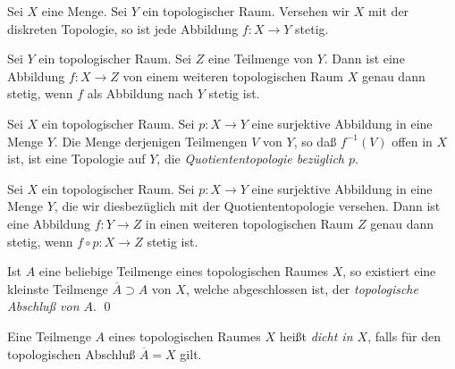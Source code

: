 \begin{example}
	Sei \(X\) eine Menge. Sei \(Y\) ein topologischer Raum. Versehen wir \(X\) mit der
	diskreten Topologie, so ist jede Abbildung \(f\colon X \to Y\) stetig.
\end{example}

\begin{example}
	Sei \(Y\) ein topologischer Raum. Sei \(Z\) eine Teilmenge von \(Y\). Dann ist eine Abbildung \(f\colon X \to Z\)
	von einem weiteren topologischen Raum \(X\) genau dann stetig, wenn \(f\) als Abbildung nach \(Y\) stetig ist.
\end{example}

\begin{definition}
	Sei \(X\) ein topologischer Raum. Sei \(p\colon X \to Y\) eine surjektive Abbildung in eine Menge \(Y\). Die Menge
	derjenigen Teilmengen \(V\) von \(Y\), so daß \(f^{-1}(V)\) offen in \(X\) ist, ist eine Topologie auf \(Y\), die
	\emph{Quotiententopologie bezüglich \(p\)}.
\end{definition}

\begin{example}
	Sei \(X\) ein topologischer Raum. Sei \(p\colon X \to Y\) eine surjektive Abbildung in eine Menge \(Y\), die wir
	diesbezüglich mit der Quotiententopologie versehen. Dann ist eine Abbildung \(f\colon Y \to Z\) in
	einen weiteren topologischen Raum \(Z\) genau dann stetig, wenn \(f \circ p\colon X \to Z\) stetig ist.
\end{example}

\begin{proposition}
	Ist \(A\) eine beliebige Teilmenge eines topologischen Raumes \(X\), so existiert eine kleinste Teilmenge
	\(\overline A \supset A\) von \(X\), welche abgeschlossen ist, der \emph{topologische Abschluß von \(A\)}.
	\qed
\end{proposition}

\begin{definition}
	Eine Teilmenge \(A\) eines topologischen Raumes \(X\) heißt \emph{dicht in \(X\)}, falls für den topologischen
	Abschluß \(\overline A = X\) gilt.
\end{definition}

